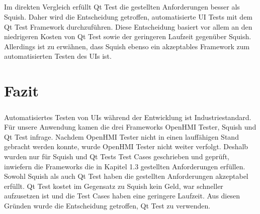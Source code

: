 	\paragraph{}Im direkten Vergleich erfüllt Qt Test die gestellten Anforderungen besser als Squish. Daher wird die Entscheidung getroffen, automatisierte UI Tests mit dem Qt Test Framework durchzuführen. Diese Entscheidung basiert vor allem an den niedrigeren Kosten von Qt Test sowie der geringeren Laufzeit gegenüber Squish. Allerdings ist zu erwähnen, dass Squish ebenso ein akzeptables Framework zum automatisierten Testen des UIs ist.

\chapter{Fazit}
	\paragraph{} Automatisiertes Testen von UIs während der Entwicklung ist Industriestandard. Für unsere Anwendung kamen die drei Frameworks OpenHMI Tester, Squish und Qt Test infrage. Nachdem OpenHMI Tester nicht in einen lauffähigen Stand gebracht werden konnte, wurde OpenHMI Tester nicht weiter verfolgt. Deshalb wurden nur für Squish und Qt Tests Test Cases geschrieben und geprüft, inwiefern die Frameworks die in Kapitel 1.3 gestellten Anforderungen erfüllen. Sowohl Squish als auch Qt Test haben die gestellten Anforderungen akzeptabel erfüllt. Qt Test kostet im Gegensatz zu Squish kein Geld, war schneller aufzusetzen ist und die Test Cases haben eine geringere Laufzeit. Aus diesen Gründen wurde die Entscheidung getroffen, Qt Test zu verwenden.